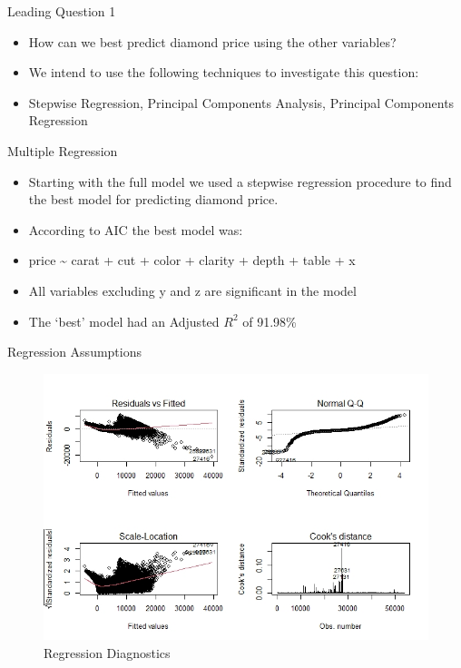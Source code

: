 \documentclass[
  ignorenonframetext,
]{beamer}
\providecommand{\tightlist}{%
  \setlength{\itemsep}{0pt}\setlength{\parskip}{0pt}}
\begin{document}
\begin{frame}{Leading Question 1}
\protect\hypertarget{leading-question-1}{}
\begin{itemize}
\tightlist
\item
  How can we best predict diamond price using the other
  variables?\linebreak 
\item
  We intend to use the following techniques to investigate this
  question:\linebreak
\item
  Stepwise Regression, Principal Components Analysis, Principal
  Components Regression\linebreak
\end{itemize}
\end{frame}

\begin{frame}{Multiple Regression}
\protect\hypertarget{multiple-regression}{}
\begin{itemize}
\tightlist
\item
  Starting with the full model we used a stepwise regression procedure
  to find the best model for predicting diamond price.\linebreak
\item
  According to AIC the best model was:\linebreak
\item
  price \textasciitilde{} carat + cut + color + clarity + depth + table
  + x\linebreak 
\item
  All variables excluding y and z are significant in the model\linebreak
\item
  The `best' model had an Adjusted \(R^2\) of 91.98\%\linebreak 
\end{itemize}
\end{frame}

\begin{frame}{Regression Assumptions}
\protect\hypertarget{regression-assumptions}{}
\begin{figure}
\centering
\includegraphics{./Regression Diagnostics.jpeg}
\caption{Regression Diagnostics}
\end{figure}
\end{frame}
\end{document}
